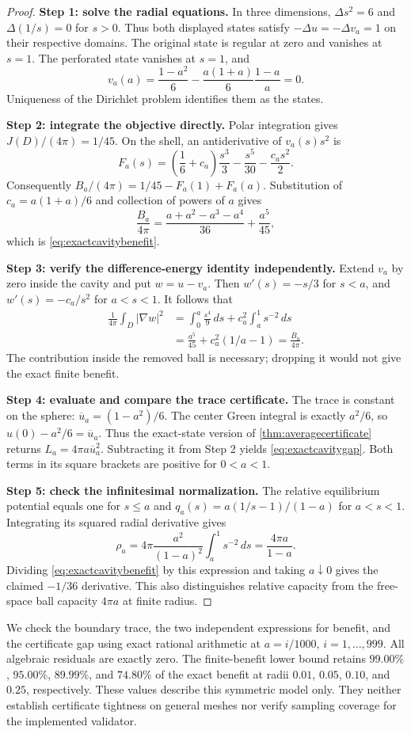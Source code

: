 \begin{proof}
\textbf{Step 1: solve the radial equations.}
In three dimensions, $\Delta s^2=6$ and $\Delta(1/s)=0$ for $s>0$.
Thus both displayed states satisfy $-\Delta u=-\Delta v_a=1$ on their
respective domains. The original state is regular at zero and vanishes at
$s=1$. The perforated state vanishes at $s=1$, and
\[
 v_a(a)=\frac{1-a^2}{6}
 -\frac{a(1+a)}6\frac{1-a}{a}=0.
\]
Uniqueness of the Dirichlet problem identifies them as the states.

\textbf{Step 2: integrate the objective directly.}
Polar integration gives $J(D)/(4\pi)=1/45$. On the shell, an antiderivative
of $v_a(s)s^2$ is
\[
 F_a(s)=\left(\frac16+c_a\right)\frac{s^3}{3}
       -\frac{s^5}{30}-\frac{c_as^2}{2}.
\]
Consequently $B_a/(4\pi)=1/45-F_a(1)+F_a(a)$.
Substitution of $c_a=a(1+a)/6$ and collection of powers of $a$ gives
\[
 \frac{B_a}{4\pi}
 =\frac{a+a^2-a^3-a^4}{36}+\frac{a^5}{45},
\]
which is \cref{eq:exactcavitybenefit}.

\textbf{Step 3: verify the difference-energy identity independently.}
Extend $v_a$ by zero inside the cavity and put $w=u-v_a$.
Then $w'(s)=-s/3$ for $s<a$, and $w'(s)=-c_a/s^2$ for $a<s<1$.
It follows that
\begin{align}
 \frac1{4\pi}\int_D|\nabla w|^2
 &=\int_0^a\frac{s^4}{9}\,ds
   +c_a^2\int_a^1s^{-2}\,ds\\
 &=\frac{a^5}{45}+c_a^2(1/a-1)
 =\frac{B_a}{4\pi}.
\end{align}
The contribution inside the removed ball is necessary; dropping it would
not give the exact finite benefit.

\textbf{Step 4: evaluate and compare the trace certificate.}
The trace is constant on the sphere: $\overline u_a=(1-a^2)/6$.
The center Green integral is exactly $a^2/6$, so
$u(0)-a^2/6=\overline u_a$. Thus the exact-state version of
\cref{thm:averagecertificate} returns $L_a=4\pi a\overline u_a^2$.
Subtracting it from Step 2 yields \cref{eq:exactcavitygap}.
Both terms in its square brackets are positive for $0<a<1$.

\textbf{Step 5: check the infinitesimal normalization.}
The relative equilibrium potential equals one for $s\le a$ and
$q_a(s)=a(1/s-1)/(1-a)$ for $a<s<1$.
Integrating its squared radial derivative gives
\[
 \rho_a=4\pi\frac{a^2}{(1-a)^2}\int_a^1s^{-2}\,ds
       =\frac{4\pi a}{1-a}.
\]
Dividing \cref{eq:exactcavitybenefit} by this expression and taking
$a\downarrow0$ gives the claimed $-1/36$ derivative. This also distinguishes
relative capacity from the free-space ball capacity $4\pi a$ at finite radius.
\end{proof}

We check the boundary trace, the two independent expressions for benefit, and
the certificate gap using exact rational arithmetic at
$a=i/1000$, $i=1,\ldots,999$. All algebraic residuals are exactly zero.
The finite-benefit lower bound retains $99.00\%$, $95.00\%$, $89.99\%$,
and $74.80\%$ of the exact benefit at radii $0.01$, $0.05$, $0.10$, and
$0.25$, respectively. These values describe this symmetric model only.
They neither establish certificate tightness on general meshes nor verify
sampling coverage for the implemented validator.

